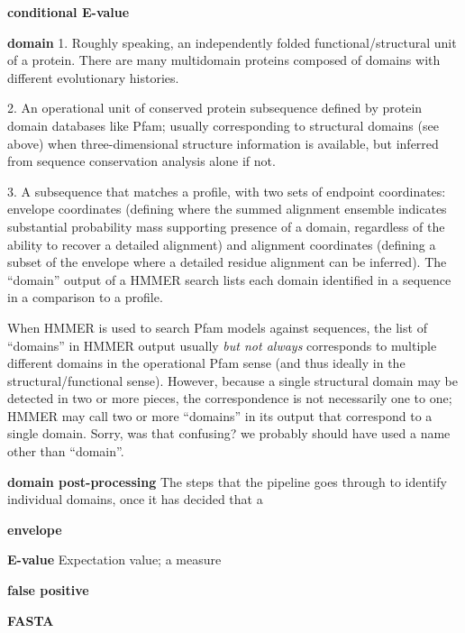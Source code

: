 \begin{wideitem}
\item[\textbf{conditional E-value}]


\item[\textbf{domain}]
  1. Roughly speaking, an independently folded functional/structural
  unit of a protein. There are many multidomain proteins composed of
  domains with different evolutionary histories. 

  2. An operational unit of conserved protein subsequence defined by
  protein domain databases like Pfam; usually corresponding to
  structural domains (see above) when three-dimensional structure
  information is available, but inferred from sequence conservation
  analysis alone if not.

  3. A subsequence that matches a profile, with two sets of endpoint
  coordinates: envelope coordinates (defining where the summed
  alignment ensemble indicates substantial probability mass supporting
  presence of a domain, regardless of the ability to recover a
  detailed alignment) and alignment coordinates (defining a subset of
  the envelope where a detailed residue alignment can be inferred).
  The ``domain'' output of a HMMER search lists each domain identified
  in a sequence in a comparison to a profile.
     
  When HMMER is used to search Pfam models against sequences, the list
  of ``domains'' in HMMER output usually \emph{but not always}
  corresponds to multiple different domains in the operational Pfam
  sense (and thus ideally in the structural/functional
  sense). However, because a single structural domain may be detected
  in two or more pieces, the correspondence is not necessarily one to
  one; HMMER may call two or more ``domains'' in its output that
  correspond to a single domain. Sorry, was that confusing? we
  probably should have used a name other than ``domain''.

\item[\textbf{domain post-processing}] The steps that the pipeline
  goes through to identify individual domains, once it has decided
  that a 

\item[\textbf{envelope}]



\item[\textbf{E-value}]
  Expectation value; a measure 

\item[\textbf{false positive}]

\item[\textbf{FASTA}]


\end{wideitem}
